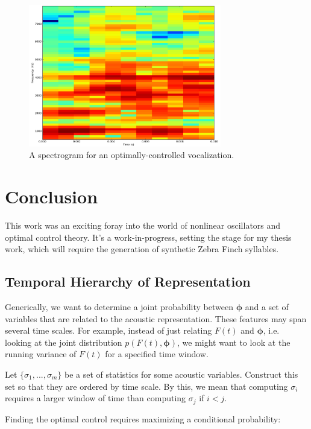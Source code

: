 \documentclass{article} %
\begin{document}
\begin{figure}[h]
\centering
\includegraphics[width=0.75\textwidth]{images/spectrogram.png}
\caption{A spectrogram for an optimally-controlled vocalization.}
\label{fig:spectrogram}
\end{figure}


\section{Conclusion}

This work was an exciting foray into the world of nonlinear oscillators and optimal control
theory. It's a work-in-progress, setting the stage for my thesis work, which will require
the generation of synthetic Zebra Finch syllables.


\iffalse
\subsection{Temporal Hierarchy of Representation}

Generically, we want to determine a joint probability between $\bm{\phi}$ and a set of
variables that are related to the acoustic representation. These features may span several
time scales. For example, instead of just relating $F(t)$ and $\bm{\phi}$, i.e. looking
at the joint distribution $p \left( F(t), \bm{\phi} \right)$, we might want to look
at the running variance of $F(t)$ for a specified time window.

Let $\{ \sigma_1, ..., \sigma_m \}$ be a set of statistics for some acoustic variables. Construct
this set so that they are ordered by time scale. By this, we mean that computing $\sigma_i$
requires a larger window of time than computing $\sigma_j$ if $i < j$.

Finding the optimal control requires maximizing a conditional probability:
\end{document}
